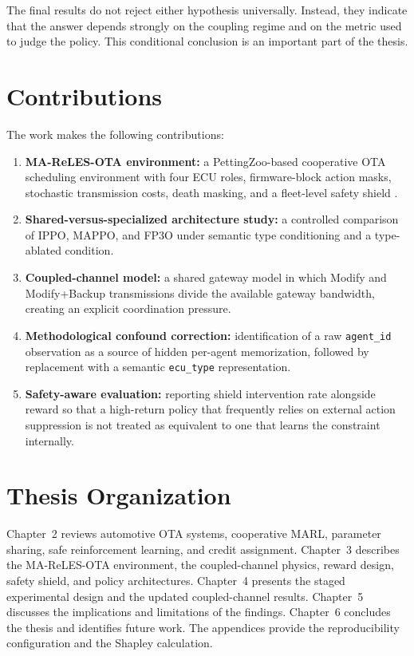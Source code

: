 \documentclass{iutbscthesis}
\begin{document}
The final results do not reject either hypothesis universally. Instead, they indicate that the answer depends strongly on the coupling regime and on the metric used to judge the policy. This conditional conclusion is an important part of the thesis.

\section{Contributions}
The work makes the following contributions:
\begin{enumerate}[leftmargin=*]
    \item \textbf{MA-ReLES-OTA environment:} a PettingZoo-based cooperative OTA scheduling environment with four ECU roles, firmware-block action masks, stochastic transmission costs, death masking, and a fleet-level safety shield \parencite{terry2021pettingzoo,towers2024gymnasium}.
    \item \textbf{Shared-versus-specialized architecture study:} a controlled comparison of IPPO, MAPPO, and FP3O under semantic type conditioning and a type-ablated condition.
    \item \textbf{Coupled-channel model:} a shared gateway model in which Modify and Modify+Backup transmissions divide the available gateway bandwidth, creating an explicit coordination pressure.
    \item \textbf{Methodological confound correction:} identification of a raw \texttt{agent\_id} observation as a source of hidden per-agent memorization, followed by replacement with a semantic \texttt{ecu\_type} representation.
    \item \textbf{Safety-aware evaluation:} reporting shield intervention rate alongside reward so that a high-return policy that frequently relies on external action suppression is not treated as equivalent to one that learns the constraint internally.
\end{enumerate}

\section{Thesis Organization}
Chapter~2 reviews automotive OTA systems, cooperative MARL, parameter sharing, safe reinforcement learning, and credit assignment. Chapter~3 describes the MA-ReLES-OTA environment, the coupled-channel physics, reward design, safety shield, and policy architectures. Chapter~4 presents the staged experimental design and the updated coupled-channel results. Chapter~5 discusses the implications and limitations of the findings. Chapter~6 concludes the thesis and identifies future work. The appendices provide the reproducibility configuration and the Shapley calculation.
\end{document}
